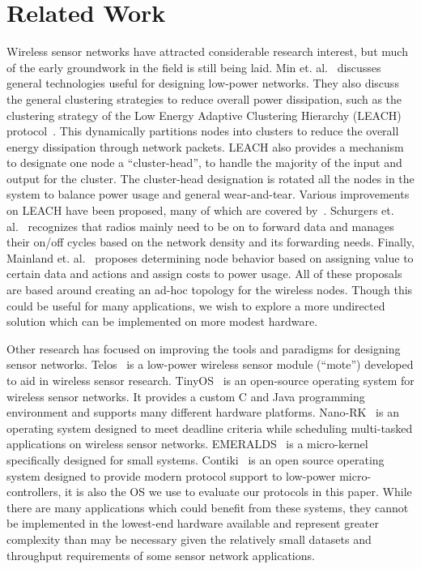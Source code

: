 \section{Related Work}

Wireless sensor networks have attracted considerable research interest, but much of the early groundwork in the field
is still being laid.  Min et. al.~\cite{min01} discusses general technologies useful for designing low-power networks.
They also discuss the general clustering strategies to reduce overall power dissipation, such as the clustering strategy
of the Low Energy Adaptive Clustering Hierarchy (LEACH) protocol~\cite{heinzelman00}.  This dynamically partitions nodes
into clusters to reduce the overall energy dissipation through network packets.  LEACH also provides a mechanism to
designate one node a ``cluster-head'', to handle the majority of the input and output for the cluster.  The cluster-head
designation is rotated all the nodes in the system to balance power usage and general wear-and-tear.  Various improvements
on LEACH have been proposed, many of which are covered by~\cite{ramesh11}.  Schurgers et. al.~\cite{schurgers02} recognizes
that radios mainly need to be on to forward data and manages their on/off cycles based on the network density and its
forwarding needs.  Finally, Mainland et. al.~\cite{mainland05} proposes determining node behavior based on assigning value
to certain data and actions and assign costs to power usage.
All of these proposals are based around creating an ad-hoc topology for the wireless nodes.  Though
this could be useful for many applications, we wish to explore a more undirected solution which can be implemented on more
modest hardware.


Other research has focused on improving the tools and paradigms for designing sensor networks.  Telos~\cite{telos} is a
low-power wireless sensor module (``mote'') developed to aid in wireless sensor research.  TinyOS~\cite{tinyos} is an
open-source operating system for wireless sensor networks.  It provides a custom C and Java programming environment and
supports many different hardware platforms.  Nano-RK~\cite{eswaran05} is an operating system designed to meet deadline
criteria while scheduling multi-tasked applications on wireless sensor networks.  EMERALDS~\cite{zuberi99} is a
micro-kernel specifically designed for small systems.  Contiki~\cite{contiki} is an open source operating system designed
to provide modern protocol support to low-power micro-controllers, it is also the OS we use to evaluate our protocols
in this paper.
While there are many applications which could benefit from these
systems, they cannot be implemented in the lowest-end hardware available and represent greater complexity than may be
necessary given the relatively small datasets and throughput requirements of some sensor network applications.


